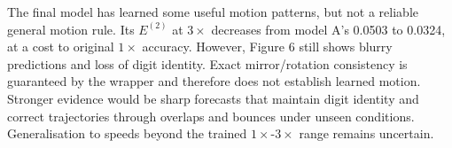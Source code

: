 The final model has learned some useful motion patterns, but not a reliable general motion rule. Its $E^{(2)}$ at $3\times$ decreases from model A's 0.0503 to 0.0324, at a cost to original $1\times$ accuracy. However, Figure 6 still shows blurry predictions and loss of digit identity. Exact mirror/rotation consistency is guaranteed by the wrapper and therefore does not establish learned motion. Stronger evidence would be sharp forecasts that maintain digit identity and correct trajectories through overlaps and bounces under unseen conditions. Generalisation to speeds beyond the trained $1\times$-$3\times$ range remains uncertain.
